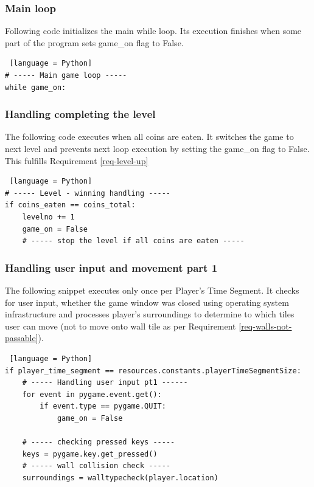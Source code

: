 \documentclass[11pt,a4paper,notitlepage]{report}
\begin{document}
				\subsubsection{Main loop}
					Following code initializes the main while loop. Its execution finishes when some part of the program sets game\_on flag to False.
					\begin{lstlisting} [language = Python]
# ----- Main game loop -----
while game_on:
					\end{lstlisting}
				\subsubsection{Handling completing the level}
					The following code executes when all coins are eaten. It switches the game to next level and prevents next loop execution by setting the game\_on flag to False. This fulfills Requirement \ref{req-level-up}
					\begin{lstlisting} [language = Python]
# ----- Level - winning handling -----
if coins_eaten == coins_total:
	levelno += 1
	game_on = False
	# ----- stop the level if all coins are eaten -----
					\end{lstlisting}
				\subsubsection{Handling user input and movement part 1}
					The following snippet executes only once per Player's Time Segment. It checks for user input, whether the game window was closed using operating system infrastructure and processes player's surroundings to determine to which tiles user can move (not to move onto wall tile as per Requirement \ref{req-walls-not-passable}).
					\begin{lstlisting} [language = Python]
if player_time_segment == resources.constants.playerTimeSegmentSize:
	# ----- Handling user input pt1 ------
	for event in pygame.event.get():
		if event.type == pygame.QUIT:
			game_on = False

	# ----- checking pressed keys -----
	keys = pygame.key.get_pressed()
	# ----- wall collision check -----
	surroundings = walltypecheck(player.location)
					\end{lstlisting}
\end{document}

